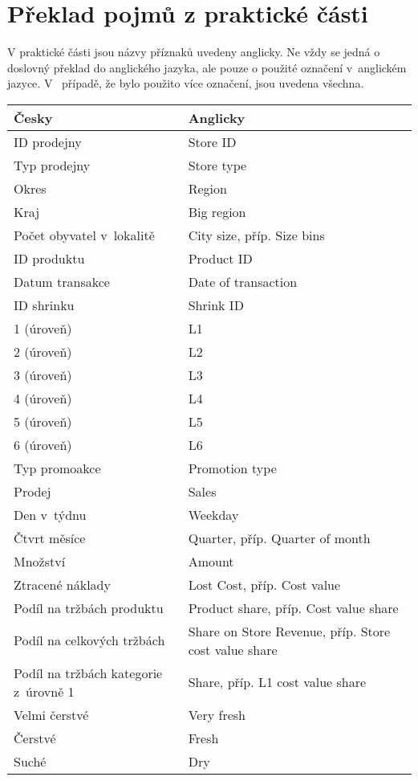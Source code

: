 \documentclass[a4paper,oneside,12pt]{book}
\begin{document}
\chapter{Překlad pojmů z praktické části}
\label{slovnik}
V praktické části jsou názvy příznaků uvedeny anglicky. Ne vždy se jedná o doslovný překlad do anglického jazyka, ale pouze o použité označení v~anglickém jazyce. V~ případě, že bylo použito více označení, jsou uvedena všechna.
\small
\begin{longtable}[h!]{lp{8cm}}
  \textbf{Česky} & \textbf{Anglicky} \\
  \midrule
  \endhead
  ID prodejny &  Store ID  \\
  Typ prodejny &  Store type  \\
  Okres &   Region \\
  Kraj &  Big region  \\
  Počet obyvatel v~lokalitě & City size, příp. Size bins \\
  ID produktu &  Product ID  \\
  Datum transakce &  Date of transaction  \\
  ID shrinku &  Shrink ID  \\
  1 (úroveň) &  L1  \\
  2 (úroveň) &  L2  \\
  3 (úroveň) &  L3  \\
  4 (úroveň) &  L4  \\
  5 (úroveň) &  L5  \\
  6 (úroveň) &  L6  \\
  Typ promoakce &  Promotion type  \\
  Prodej &  Sales  \\
  Den v~týdnu &  Weekday  \\
  Čtvrt měsíce  &  Quarter, příp. Quarter of month  \\
  Množství &  Amount  \\
  Ztracené náklady & Lost Cost, příp. Cost value   \\
  Podíl na tržbách produktu &  Product share, příp. Cost value share  \\
  Podíl na celkových tržbách &  Share on Store Revenue, příp. Store cost value share  \\
  Podíl na tržbách kategorie z~úrovně 1 &  Share, příp. L1 cost value share   \\
  Velmi čerstvé & Very fresh \\
  Čerstvé & Fresh \\
  Suché & Dry \\

\end{longtable}
\end{document}
